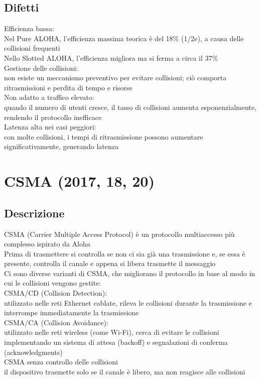 \documentclass[10pt,oneside,a4paper]{article}
\begin{document}
\subsection{Difetti}
Efficienza bassa:\\
Nel Pure ALOHA, l'efficienza massima teorica è del 18$\%$ (1/2e), a causa delle collisioni frequenti\\
Nello Slotted ALOHA, l'efficienza migliora ma si ferma a circa il 37$\%$\\
Gestione delle collisioni:\\
non esiste un meccanismo preventivo per evitare collisioni; ciò comporta ritrasmissioni e perdita di tempo e risorse\\
Non adatto a traffico elevato:\\
quando il numero di utenti cresce, il tasso di collisioni aumenta esponenzialmente, rendendo il protocollo inefficace\\
Latenza alta nei casi peggiori:\\
con molte collisioni, i tempi di ritrasmissione possono aumentare significativamente, generando latenza
\section{CSMA (2017, 18, 20)}
\subsection{Descrizione}
CSMA (Carrier Multiple Access Protocol) è un protocollo multiaccesso più complesso ispirato da Aloha\\
Prima di trasmettere si controlla se non ci sia già una trasmissione e, se essa è presente, controlla il canale e appena si libera trasmette il messaggio\\
Ci sono diverse varianti di CSMA, che migliorano il protocollo in base al modo in cui le collisioni vengono gestite:\\
CSMA/CD (Collision Detection):\\
utilizzato nelle reti Ethernet cablate, rileva le collisioni durante la trasmissione e interrompe immediatamente la trasmissione\\
CSMA/CA (Collision Avoidance):\\
utilizzato nelle reti wireless (come Wi-Fi), cerca di evitare le collisioni implementando un sistema di attesa (backoff) e segnalazioni di conferma (acknowledgments)\\
CSMA senza controllo delle collisioni\\
il dispositivo trasmette solo se il canale è libero, ma non reagisce alle collisioni
\end{document}

